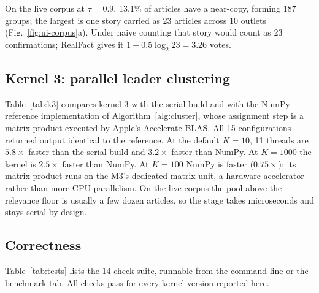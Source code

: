 \documentclass[conference,a4paper]{IEEEtran}
\begin{document}
On the live corpus at $\tau=0.9$, 13.1\% of articles have a near-copy, forming 187 groups; the largest is one story
carried as 23 articles across 10 outlets (Fig.~\ref{fig:ui-corpus}a). Under naive counting that story would count as 23
confirmations; RealFact gives it $1+0.5\log_2 23=3.26$ votes.

\subsection{Kernel 3: parallel leader clustering}
Table~\ref{tab:k3} compares kernel 3 with the serial build and with the NumPy reference implementation of
Algorithm~\ref{alg:cluster}, whose assignment step is a matrix product executed by Apple's Accelerate BLAS. All 15
configurations returned output identical to the reference. At the default $K=10$, 11 threads are $5.8\times$ faster
than the serial build and $3.2\times$ faster than NumPy. At $K=1000$ the kernel is $2.5\times$ faster than NumPy. At
$K=100$ NumPy is faster ($0.75\times$): its matrix product runs on the M3's dedicated matrix unit, a hardware
accelerator rather than more CPU parallelism. On the live corpus the pool above the relevance floor is usually a few
dozen articles, so the stage takes microseconds and stays serial by design.

\begin{table}[!t]
\caption{Kernel 3 on a pool of 8,983 syndicated candidates (median ms)}
\label{tab:k3}
\centering\footnotesize
\setlength{\tabcolsep}{3.2pt}
\end{table}

\subsection{Correctness}
Table~\ref{tab:tests} lists the 14-check suite, runnable from the command line or the benchmark tab. All checks pass
for every kernel version reported here.
\end{document}
